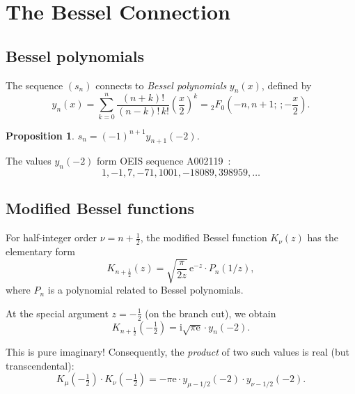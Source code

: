 \documentclass[11pt]{article}
\newtheorem{proposition}[theorem]{Proposition}
\theoremstyle{definition}
\theoremstyle{remark}
\newcommand{\ee}{\mathrm{e}}
\newcommand{\ii}{\mathrm{i}}
\begin{document}
\section{The Bessel Connection}

\subsection{Bessel polynomials}

The sequence $(s_n)$ connects to \emph{Bessel polynomials} $y_n(x)$, defined by
\begin{equation}
y_n(x) = \sum_{k=0}^{n} \frac{(n+k)!}{(n-k)!\, k!} \left(\frac{x}{2}\right)^k
= {}_2F_0\!\left(-n, n+1; \,; -\frac{x}{2}\right).
\end{equation}

\begin{proposition}
$s_n = (-1)^{n+1} y_{n+1}(-2)$.
\end{proposition}

The values $y_n(-2)$ form OEIS sequence A002119~\cite{OEIS-A002119}:
\[
1, -1, 7, -71, 1001, -18089, 398959, \ldots
\]

\subsection{Modified Bessel functions}

For half-integer order $\nu = n + \frac{1}{2}$, the modified Bessel function
$K_\nu(z)$ has the elementary form~\cite{Watson1944}
\begin{equation}\label{eq:K-half}
K_{n+\frac{1}{2}}(z) = \sqrt{\frac{\pi}{2z}}\, \ee^{-z} \cdot P_n(1/z),
\end{equation}
where $P_n$ is a polynomial related to Bessel polynomials.

At the special argument $z = -\frac{1}{2}$ (on the branch cut), we obtain
\begin{equation}\label{eq:K-special}
K_{n+\frac{1}{2}}\!\left(-\tfrac{1}{2}\right) = \ii\sqrt{\pi\ee} \cdot y_n(-2).
\end{equation}

This is pure imaginary! Consequently, the \emph{product} of two such values
is real (but transcendental):
\begin{equation}\label{eq:K-product}
K_\mu\!\left(-\tfrac{1}{2}\right) \cdot K_\nu\!\left(-\tfrac{1}{2}\right)
= -\pi\ee \cdot y_{\mu-1/2}(-2) \cdot y_{\nu-1/2}(-2).
\end{equation}
\end{document}
